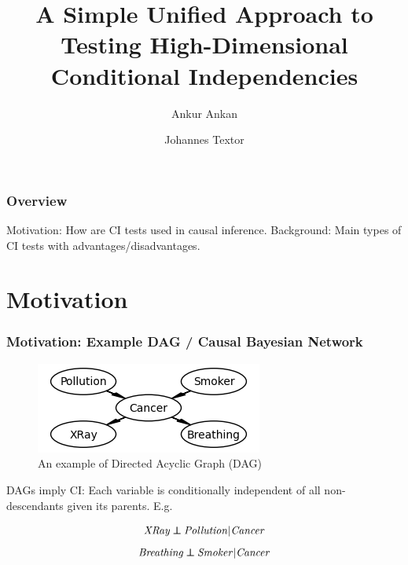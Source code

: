 \documentclass{beamer}
\def\ci{\perp\!\!\!\!\!\perp}
\begin{document}
\title{A Simple Unified Approach to Testing High-Dimensional Conditional Independencies}
\author {Ankur Ankan \and Johannes Textor}
\date{}
\maketitle

\begin{frame}
	\frametitle{Overview}
	\tableofcontents
	Motivation: How are CI tests used in causal inference.
	Background: Main types of CI tests with advantages/disadvantages.
\end{frame}

\section{Motivation}
\begin{frame}
	\frametitle{Motivation: Example DAG / Causal Bayesian Network}
	\begin{figure}
		\centering
		\includegraphics[scale=0.6]{imgs/example_dag.png}
		\caption*{An example of Directed Acyclic Graph (DAG) \footnotemark}
	\end{figure}
	\begin{center}
	DAGs imply CI: Each variable is conditionally independent of all non-descendants given its parents. E.g.

			$$ \text{\emph{XRay}} \ci \text{\emph{Pollution}} | \text{\emph{Cancer}} $$
			$$ \text{\emph{Breathing}} \ci \text{\emph{Smoker}} | \text{\emph{Cancer}} $$
	\end{center}
\end{frame}
\end{document}
